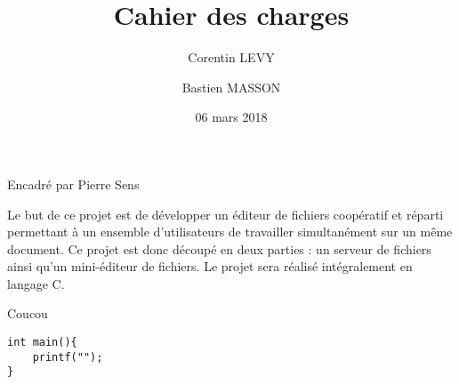 \documentclass[12pt]{article}
\title{Cahier des charges}
\author{Corentin LEVY\\
		\and
		Bastien MASSON}
\date{06 mars 2018}
\begin{document}
\begin{titlepage}

\maketitle
\begin{center}
Encadré par Pierre Sens
\end{center}

Le but de ce projet est de développer un éditeur de fichiers coopératif et réparti permettant à un ensemble d'utilisateurs de travailler simultanément sur un même document. Ce projet est donc découpé en deux parties : un serveur de fichiers ainsi qu'un mini-éditeur de fichiers. Le projet sera réalisé intégralement en langage C.

\end{titlepage}
Coucou
\begin{verbatim}
int main(){
	printf("");
}
\end{verbatim}
\end{document}
